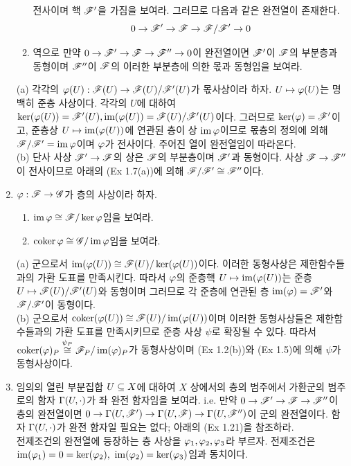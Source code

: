 \begin{enumerate}[label=\tb{1.\arabic*.},itemindent=0mm,itemsep=4mm]
\begin{enumerate}[label=(\alph*)]
	전사이며 핵 $\mathscr{F}'$을 가짐을 보여라. 그러므로 다음과 같은 완전열이 존재한다.
	$$0\rightarrow\mathscr{F}'\rightarrow\mathscr{F}\rightarrow\mathscr{F}/\mathscr{F}'\rightarrow 0$$
	\item 역으로 만약 $0\rightarrow\mathscr{F}'\rightarrow\mathscr{F}\rightarrow\mathscr{F}''\rightarrow 0$이 완전열이면 $\mathscr{F}'$이 $\mathscr{F}$의 부분층과 동형이며
	$\mathscr{F}''$이 $\mathscr{F}$의 이러한 부분층에 의한 몫과 동형임을 보여라.
	\end{enumerate}
	\sol (a) 각각의 $\varphi(U):\mathscr{F}(U)\rightarrow\mathscr{F}(U)/\mathscr{F}'(U)$가 몫사상이라 하자. $U\mapsto\varphi(U)$는 명백히 준층 사상이다.
	각각의 $U$에 대하여 $\ker(\varphi(U))=\mathscr{F}'(U),\operatorname{im}(\varphi(U))=\mathscr{F}(U)/\mathscr{F}'(U)$이다. 그러므로 $\ker(\varphi)=\mathscr{F}'$이고,
	준층상 $U\mapsto\operatorname{im}(\varphi(U))$에 연관된 층이 상 $\operatorname{im}\varphi$이므로 몫층의 정의에 의해 $\mathscr{F}/\mathscr{F}'=\operatorname{im}\varphi$이며 $\varphi$가 전사이다.
	주어진 열이 완전열임이 따라온다.\\
	(b) 단사 사상 $\mathscr{F}'\rightarrow\mathscr{F}$의 상은 $\mathscr{F}$의 부분층이며 $\mathscr{F}'$과 동형이다.
	사상 $\mathscr{F}\rightarrow\mathscr{F}''$이 전사이므로 아래의 (Ex 1.7(a))에 의해 $\mathscr{F}/\mathscr{F}'\cong\mathscr{F}''$이다.
	\item $\varphi:\mathscr{F}\rightarrow\mathscr{G}$가 층의 사상이라 하자.
	\begin{enumerate}[label=(\alph*)]
	\item $\operatorname{im}\varphi\cong\mathscr{F}/\ker\varphi$임을 보여라.
	\item $\operatorname{coker}\varphi\cong\mathscr{G}/\operatorname{im}\varphi$임을 보여라.
	\end{enumerate}
	\sol (a) 군으로서 $\operatorname{im}(\varphi(U))\cong\mathscr{F}(U)/\ker(\varphi(U))$이다. 이러한 동형사상은 제한함수들과의 가환 도표를 만족시킨다.
	따라서 $\varphi$의 준층핵 $U\mapsto\operatorname{im}(\varphi(U))$는 준층 $U\mapsto\mathscr{F}(U)/\mathscr{F}'(U)$와 동형이며
	그러므로 각 준층에 연관된 층 $\operatorname{im}(\varphi)=\mathscr{F}'$와 $\mathscr{F}/\mathscr{F}'$이 동형이다.\\
	(b) 군으로서 $\operatorname{coker}(\varphi(U))\cong\mathscr{F}(U)/\operatorname{im}(\varphi(U))$이며 이러한 동형사상들은 제한함수들과의 가환 도표를 만족시키므로
	준층 사상 $\psi$로 확장될 수 있다. 따라서 $\operatorname{coker}(\varphi)_P\stackrel{\psi_P}{\cong}\mathscr{F}_P/\operatorname{im}(\varphi)_P$가 동형사상이며
	(Ex 1.2(b))와 (Ex 1.5)에 의해 $\psi$가 동형사상이다.
	\item 임의의 열린 부분집합 $U\subseteq X$에 대하여 $X$ 상에서의 층의 범주에서 가환군의 범주로의 함자 $\Gamma(U,\cdot)$가
	좌 완전 함자임을 보여라. i.e. 만약 $0\rightarrow\mathscr{F}'\rightarrow\mathscr{F}\rightarrow\mathscr{F}''$이 층의 완전열이면
	$0\rightarrow\Gamma(U,\mathscr{F}')\rightarrow\Gamma(U,\mathscr{F})\rightarrow\Gamma(U,\mathscr{F}'')$이 군의 완전열이다.
	함자 $\Gamma(U,\cdot)$가 완전 함자일 필요는 없다; 아래의 (Ex 1.21)을 참조하라.\\
	\sol 전제조건의 완전열에 등장하는 층 사상을 $\varphi_1,\varphi_2,\varphi_3$라 부르자.
	전제조건은 $\operatorname{im}(\varphi_1)=0=\ker(\varphi_2),$ $\operatorname{im}(\varphi_2)=\ker(\varphi_3)$임과 동치이다.

\end{enumerate}
